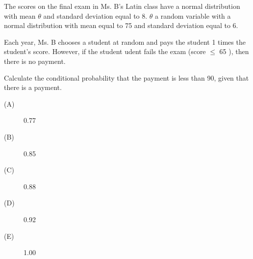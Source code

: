  The scores on the final exam in Ms. B's Latin class have a normal 
distribution with mean $\theta$
and standard deviation equal to 8. $\theta$ a random variable with a normal 
distribution with mean equal to 75 and standard deviation equal to 6.

Each year, Ms. B chooses a student at random and pays the student 1 times 
the student's score. However, if the student udent fails the exam 
(score $\leq$ 65 ), then there is no payment.

Calculate the conditional probability that the payment is less than 90, 
given that there is a payment.
\begin{description}
\item[(A)] 0.77
\item[(B)] 0.85
\item[(C)] 0.88
\item[(D)] 0.92
\item[(E)] 1.00
\end{description}
